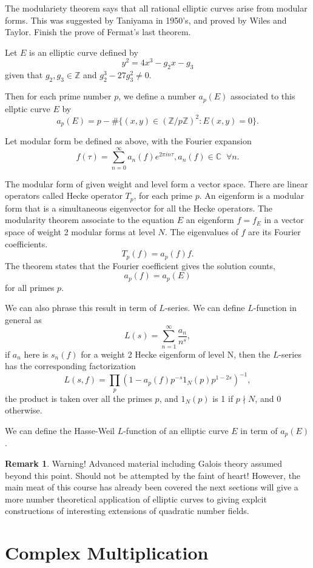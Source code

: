 \documentclass{article}
\newcommand{\Z}{\mathbb{Z}}
\newcommand{\C}{\mathbb{C}}
\theoremstyle{definition}
\newtheorem{remark}{Remark}[section]
\begin{document}
{The modulariety theorem says that all rational elliptic curves arise from modular forms. This was suggested by Taniyama in 1950's, and proved by Wiles and Taylor. Finish the prove of Fermat's last theorem.

Let $E$ is an elliptic curve defined by \[y^2 = 4x^3 - g_2x - g_3\] given that $g_2, g_3 \in \Z$ and $g_2^3 - 27 g_3^2 \ne 0$.

Then for each prime number $p$, we define a number $a_p(E)$ associated to this ellptic curve $E$ by 
\[a_p(E) = p - \#\{(x, y) \in (\Z/p\Z)^2: E(x,y) = 0\}.\]

Let modular form be defined as above, with the Fourier expansion 
\[f(\tau) = \sum_{n = 0}^\infty a_n(f) e^{2 \pi i n \tau}, a_n(f) \in \C\;\; \forall n.\]

The modular form of given weight and level form a vector space. There are linear operators called Hecke operator $T_p$, for each prime $p$. An eigenform is a modular form that is a simultaneous eigenvector for all the Hecke operators. The modularity theorem associate to the equation $E$ an eigenform $f = f_E$ in a vector space of weight 2 modular forms at level $N$. The eigenvalues of $f$ are its Fourier coefficients. 
\[T_p(f) = a_p(f)f.\]
The theorem states that the Fourier coefficient gives the solution counts, 
\[a_p(f) = a_p(E)\] for all primes $p$.

We can also phrase this result in term of $L$-series. We can define $L$-function in general as 
\[L(s) = \sum_{n = 1}^\infty \frac{a_n}{n^s},\] if $a_n$ here is $s_n(f)$ for a weight 2 Hecke eigenform of level N, then the $L$-series has the corresponding factorization
\[L(s, f) = \prod_p (1 - a_p(f)p^{-s} 1_N(p)p^{1-2s})^{-1},\]
the product is taken over all the primes $p$, and $1_N(p)$ is 1 if $p \nmid N$, and $0$ otherwise.

We can define the Hasse-Weil $L$-function of an elliptic curve $E$ in term of $a_p(E)$.

}


\begin{remark}
Warning! Advanced material including Galois theory assumed beyond this point. Should not be attempted by the faint of heart! However, the main meat of this course has already been covered the next sections will give a more number theoretical application of elliptic curves to giving explcit constructions of interesting extensions of quadratic number fields. 
\end{remark}


\section{Complex Multiplication}
\end{document}
